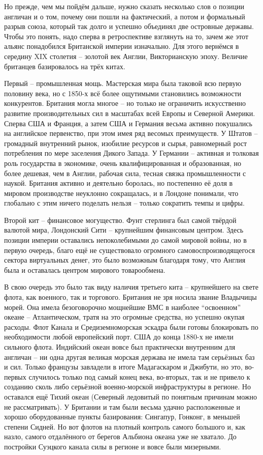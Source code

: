Но прежде, чем мы пойдём дальше, нужно сказать несколько слов о позиции англичан и о том, почему они пошли на фактический, а потом и формальный разрыв союза, который так долго и успешно объединял две островные державы. Чтобы это понять, надо сперва в ретроспективе взглянуть на то, зачем же этот альянс понадобился Британской империи изначально. Для этого вернёмся в середину XIX столетия – золотой век Англии, Викторианскую эпоху. Величие британцев базировалось на трёх китах.

Первый – промышленная мощь. Мастерская мира была таковой всю первую половину века, но с 1850-х всё более ощутимыми становились возможности конкурентов. Британия могла многое – но только не ограничить искусственно развитие производительных сил в масштабах всей Европы и Северной Америки. Сперва США и Франция, а затем США и Германия весьма активно покушались на английское первенство, при этом имея ряд весомых преимуществ. У Штатов – громадный внутренний рынок, изобилие ресурсов и сырья, равномерный рост потребления по мере заселения Дикого Запада. У Германии – активная и толковая роль государства в экономике, очень квалифицированная и образованная, но более дешевая, чем в Англии, рабочая сила, тесная связка промышленности с наукой. Британия активно и деятельно боролась, но постепенно её доля в мировом производстве неуклонно сокращалась, и в Лондоне понимали, что глобально с этим ничего поделать нельзя – только сократить темпы и цифры.

Второй кит – финансовое могущество. Фунт стерлинга был самой твёрдой валютой мира, Лондонский Сити – крупнейшим финансовым центром. Здесь позиции империи оставались непоколебимыми до самой мировой войны, но в первую очередь, благо ещё не существовало огромного самовоспроизводящегося сектора виртуальных денег, это было возможным благодаря тому, что Англия была и оставалась центром мирового товарообмена.

В свою очередь это было так виду наличия третьего кита – крупнейшего на свете флота, как военного, так и торгового. Британия не зря носила звание Владычицы морей. Она имела безоговорочно мощнейшие ВМС в наиболее “освоенном” океане – Атлантическом, тратя на это огромные средства, но успешно окупая расходы. Флот Канала и Средиземноморская эскадра были готовы блокировать по необходимости любой европейский порт. США до конца 1880-х не имели сильного флота. Индийский океан вовсе был практически внутренним для англичан – ни одна другая великая морская держава не имела там серьёзных баз и сил. Только французы завладели в итоге Мадагаскаром и Джибути, но это, во-первых случилось только под самый конец века, во-вторых, так и не привело к созданию сколь либо серьёзной военно-морской инфраструктуры в регионе. Но оставался ещё Тихий океан (Северный ледовитый по понятным причинам можно не рассматривать). У Британии и там были весьма удачно расположенные и хорошо оборудованные пункты базирования: Сингапур, Гонконг, в меньшей степени Сидней. Но вот флотов на плотный контроль самого большого и, как назло, самого отдалённого от берегов Альбиона океана уже не хватало. До постройки Суэцкого канала силы в регионе и вовсе были мизерными.

